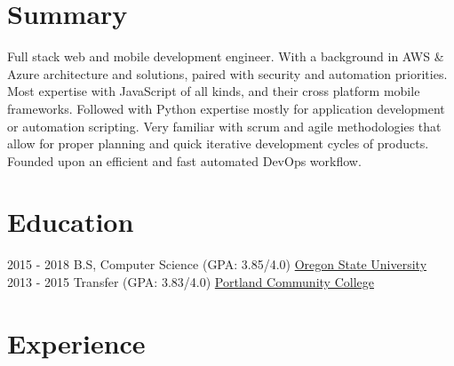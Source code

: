 \documentclass[letterpaper]{twentysecondcv} %
\begin{document}
    \makeprofile %
    \section{Summary}
        Full stack web and mobile development engineer. With a background in AWS \& Azure architecture and solutions, paired with security and automation priorities. 
        \newline \newline 
        Most expertise with JavaScript of all kinds, and their cross platform mobile frameworks. Followed with Python expertise mostly for application development or automation scripting.
        \newline \newline
        Very familiar with scrum and agile methodologies that allow for proper planning and quick iterative development cycles of products. Founded upon an efficient and fast automated DevOps workflow. 
    \section{Education}
    
    \begin{twenty} %
    	\twentyitem
        	{2015 - 2018 }
            {}
            {  B.S, Computer Science \textnormal{(GPA: 3.85/4.0)}}
            {\href{http://www.oregonstate.edu/}{Oregon State University}}
            {}
            {}
    	\twentyitem
        	{2013 - 2015}
    		{}
            { Transfer \textnormal{(GPA: 3.83/4.0)}}
            {\href{https://www.pcc.edu/}{Portland Community College}}
            {}
            {}
    \end{twenty}
    
    
    \section{Experience}
    
\end{document}
